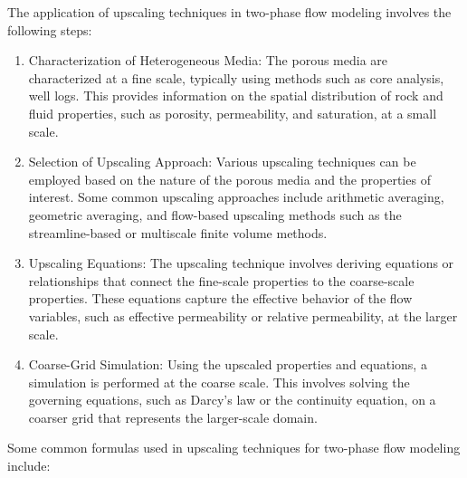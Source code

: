 		The application of upscaling techniques in two-phase flow modeling involves the following steps:

		\begin{enumerate}
			\item Characterization of Heterogeneous Media:	The porous media are characterized at a fine scale, typically using methods such as core analysis, well logs. This provides information on the spatial distribution of rock and fluid properties, such as porosity, permeability, and saturation, at a small scale.

			\item Selection of Upscaling Approach:	Various upscaling techniques can be employed based on the nature of the porous media and the properties of interest. Some common upscaling approaches include arithmetic averaging, geometric averaging, and flow-based upscaling methods such as the streamline-based or multiscale finite volume methods.

			\item Upscaling Equations:	The upscaling technique involves deriving equations or relationships that connect the fine-scale properties to the coarse-scale properties. These equations capture the effective behavior of the flow variables, such as effective permeability or relative permeability, at the larger scale.

			\item Coarse-Grid Simulation: Using the upscaled properties and equations, a simulation is performed at the coarse scale. This involves solving the governing equations, such as Darcy's law or the continuity equation, on a coarser grid that represents the larger-scale domain.
			
		\end{enumerate}
		
		Some common formulas used in upscaling techniques for two-phase flow modeling include:

